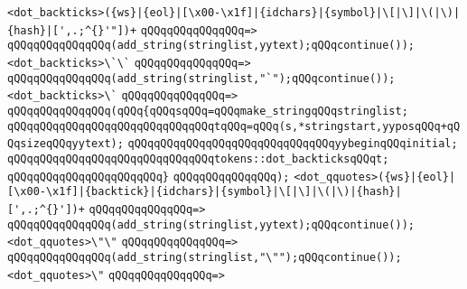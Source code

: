 \newline
\newline
\newline
\verb|<dot_backticks>({ws}|\verb#|{eol}|[\x00-\x1f]|{idchars}|{symbol}|\[|\]|\(|\)|{hash}|[',.;^{}'"])+#\newline
\verb|qQQqqQQqqQQqqQQq=>|\newline
\verb|qQQqqQQqqQQqqQQq(add_string(stringlist,yytext);qQQqcontinue());|\newline
\newline
\verb|<dot_backticks>\`\`|\newline
\verb|qQQqqQQqqQQqqQQq=>|\newline
\verb|qQQqqQQqqQQqqQQq(add_string(stringlist,"`");qQQqcontinue());|\newline
\newline
\verb|<dot_backticks>\`|\newline
\verb|qQQqqQQqqQQqqQQq=>|\newline
\verb|qQQqqQQqqQQqqQQq(qQQq{qQQqsqQQq=qQQqmake_stringqQQqstringlist;|\newline
\verb|qQQqqQQqqQQqqQQqqQQqqQQqqQQqqQQqtqQQq=qQQq(s,*stringstart,yyposqQQq+qQQqsizeqQQqyytext);|\newline
\verb|qQQqqQQqqQQqqQQqqQQqqQQqqQQqqQQqyybeginqQQqinitial;|\newline
\verb|qQQqqQQqqQQqqQQqqQQqqQQqqQQqqQQqtokens::dot_backticksqQQqt;|\newline
\verb|qQQqqQQqqQQqqQQqqQQqqQQq}|\newline
\verb|qQQqqQQqqQQqqQQq);|\newline
\newline
\newline
\newline
\verb|<dot_qquotes>({ws}|\verb#|{eol}|[\x00-\x1f]|{backtick}|{idchars}|{symbol}|\[|\]|\(|\)|{hash}|[',.;^{}'])+#\newline
\verb|qQQqqQQqqQQqqQQq=>|\newline
\verb|qQQqqQQqqQQqqQQq(add_string(stringlist,yytext);qQQqcontinue());|\newline
\newline
\verb|<dot_qquotes>\"\"|\newline
\verb|qQQqqQQqqQQqqQQq=>|\newline
\verb|qQQqqQQqqQQqqQQq(add_string(stringlist,"\"");qQQqcontinue());|\newline
\newline
\verb|<dot_qquotes>\"|\newline
\verb|qQQqqQQqqQQqqQQq=>|\newline
